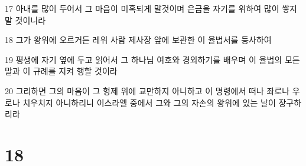 \par 17 아내를 많이 두어서 그 마음이 미혹되게 말것이며 은금을 자기를 위하여 많이 쌓지 말 것이니라
\par 18 그가 왕위에 오르거든 레위 사람 제사장 앞에 보관한 이 율법서를 등사하여
\par 19 평생에 자기 옆에 두고 읽어서 그 하나님 여호와 경외하기를 배우며 이 율법의 모든 말과 이 규례를 지켜 행할 것이라
\par 20 그리하면 그의 마음이 그 형제 위에 교만하지 아니하고 이 명령에서 떠나 좌로나 우로나 치우치지 아니하리니 이스라엘 중에서 그와 그의 자손의 왕위에 있는 날이 장구하리라

\chapter{18}


